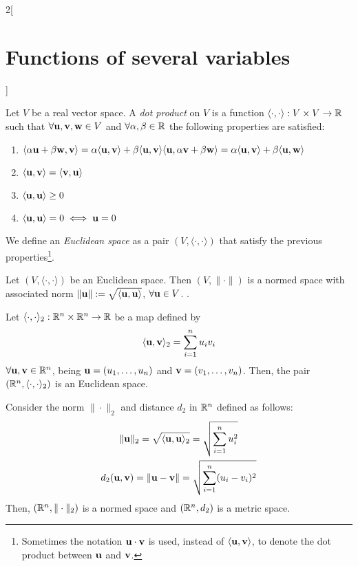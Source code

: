 \documentclass[../../../main.tex]{subfiles}
\begin{document}
\begin{multicols}{2}[\section{Functions of several variables}]
\begin{definition}
    Let $V$ be a real vector space. A \emph{dot product} on $V$ is a function $\langle\cdot,\cdot\rangle:V\times V\rightarrow\mathbb{R} $ such that $\forall \boldsymbol{\mathrm{u}},\boldsymbol{\mathrm{v}},\boldsymbol{\mathrm{w}}\in V$ and $\forall\alpha,\beta\in\mathbb{R} $ the following properties are satisfied:
    \begin{enumerate}
      \item $\langle \alpha \boldsymbol{\mathrm{u}}+\beta \boldsymbol{\mathrm{w}},\boldsymbol{\mathrm{v}}\rangle=\alpha\langle \boldsymbol{\mathrm{u}},\boldsymbol{\mathrm{v}}\rangle+\beta\langle \boldsymbol{\mathrm{u}},\boldsymbol{\mathrm{v}}\rangle\\\langle \boldsymbol{\mathrm{u}},\alpha \boldsymbol{\mathrm{v}}+\beta \boldsymbol{\mathrm{w}}\rangle=\alpha\langle \boldsymbol{\mathrm{u}},\boldsymbol{\mathrm{v}}\rangle+\beta\langle \boldsymbol{\mathrm{u}},\boldsymbol{\mathrm{w}}\rangle$
      \item $\langle \boldsymbol{\mathrm{u}},\boldsymbol{\mathrm{v}}\rangle=\langle \boldsymbol{\mathrm{v}},\boldsymbol{\mathrm{u}}\rangle$
      \item $\langle \boldsymbol{\mathrm{u}},\boldsymbol{\mathrm{u}}\rangle\geq 0$
      \item $\langle \boldsymbol{\mathrm{u}},\boldsymbol{\mathrm{u}}\rangle=0\iff \boldsymbol{\mathrm{u}}=0$
    \end{enumerate}
    We define an \emph{Euclidean space} as a pair $(V,\langle\cdot,\cdot\rangle)$ that satisfy the previous properties\footnote{Sometimes the notation $\boldsymbol{\mathrm{u}}\cdot \boldsymbol{\mathrm{v}}$ is used, instead of $\langle \boldsymbol{\mathrm{u}},\boldsymbol{\mathrm{v}}\rangle$, to denote the dot product between $\boldsymbol{\mathrm{u}}$ and $\boldsymbol{\mathrm{v}}$.}.
  \end{definition}
  \begin{proposition}
    Let $(V,\langle\cdot,\cdot\rangle)$ be an Euclidean space. Then $(V,\|\cdot\|)$ is a normed space with associated norm $\|\boldsymbol{\mathrm{u}}\|:=\sqrt{\langle \boldsymbol{\mathrm{u}},\boldsymbol{\mathrm{u}}\rangle}$, $\forall \boldsymbol{\mathrm{u}}\in V$. .
  \end{proposition}
  \begin{proposition}
    Let $\langle\cdot,\cdot\rangle_2:\mathbb{R}^n\times\mathbb{R}^n\rightarrow\mathbb{R} $ be a map defined by $$\langle \boldsymbol{\mathrm{u}},\boldsymbol{\mathrm{v}}\rangle_2=\sum_{i=1}^nu_iv_i$$ $\forall \boldsymbol{\mathrm{u}},\boldsymbol{\mathrm{v}}\in \mathbb{R}^n$, being $\boldsymbol{\mathrm{u}}=(u_1,\ldots,u_n)$ and $\boldsymbol{\mathrm{v}}=(v_1,\ldots,v_n)$. Then, the pair $(\mathbb{R}^n,\langle\cdot,\cdot\rangle_2)$ is an Euclidean space.
  \end{proposition}
  \begin{corollary}
    Consider the norm $\|\cdot\|_2$ and distance $d_2$ in $\mathbb{R}^n$ defined as follows:
    \begin{gather*}
      \|\boldsymbol{\mathrm{u}}\|_2=\sqrt{\langle \boldsymbol{\mathrm{u}},\boldsymbol{\mathrm{u}}\rangle_2}=\sqrt{\sum_{i=1}^nu_i^2}\\
      d_2(\boldsymbol{\mathrm{u}},\boldsymbol{\mathrm{v}})=\|\boldsymbol{\mathrm{u}}-\boldsymbol{\mathrm{v}}\|=\sqrt{\sum_{i=1}^n(u_i-v_i)^2}
    \end{gather*}
    Then, $(\mathbb{R}^n,\|\cdot\|_2)$ is a normed space and $(\mathbb{R}^n,d_2)$ is a metric space.

\end{corollary}
\end{multicols}
\end{document}
